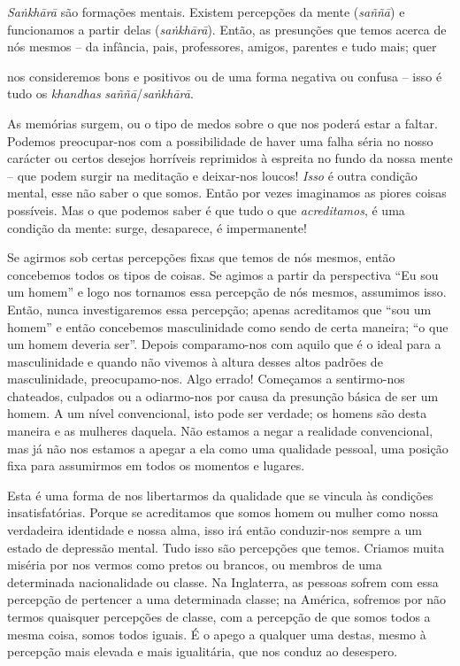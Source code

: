 \emph{Saṅkhārā} são formações mentais. Existem percepções da mente
(\emph{saññā}) e funcionamos a partir delas (\emph{saṅkhārā}). Então, as
presunções que temos acerca de nós mesmos -- da infância, pais, professores,
amigos, parentes e tudo mais; quer

nos consideremos bons e positivos ou de uma forma negativa ou confusa -- isso é
tudo os \emph{khandhas} \emph{saññā}/\emph{saṅkhārā}.

As memórias surgem, ou o tipo de medos sobre o que nos poderá estar a faltar.
Podemos preocupar-nos com a possibilidade de haver uma falha séria no nosso
carácter ou certos desejos horríveis reprimidos à espreita no fundo da nossa
mente -- que podem surgir na meditação e deixar-nos loucos! \emph{Isso} é outra
condição mental, esse não saber o que somos. Então por vezes imaginamos as
piores coisas possíveis. Mas o que podemos saber é que tudo o que
\emph{acreditamos}, é uma condição da mente: surge, desaparece, é impermanente!

Se agirmos sob certas percepções fixas que temos de nós mesmos, então concebemos
todos os tipos de coisas. Se agimos a partir da perspectiva ``Eu sou um homem''
e logo nos tornamos essa percepção de nós mesmos, assumimos isso. Então, nunca
investigaremos essa percepção; apenas acreditamos que ``sou um homem'' e então
concebemos masculinidade como sendo de certa maneira; ``o que um homem deveria
ser''. Depois comparamo-nos com aquilo que é o ideal para a masculinidade e
quando não vivemos à altura desses altos padrões de masculinidade,
preocupamo-nos. Algo errado! Começamos a sentirmo-nos chateados, culpados ou a
odiarmo-nos por causa da presunção básica de ser um homem. A um nível
convencional, isto pode ser verdade; os homens são desta maneira e as mulheres
daquela. Não estamos a negar a realidade convencional, mas já não nos estamos a
apegar a ela como uma qualidade pessoal, uma posição fixa para assumirmos em
todos os momentos e lugares.

Esta é uma forma de nos libertarmos da qualidade que se vincula às condições
insatisfatórias. Porque se acreditamos que somos homem ou mulher como nossa
verdadeira identidade e nossa alma, isso irá então conduzir-nos sempre a um
estado de depressão mental. Tudo isso são percepções que temos. Criamos muita
miséria por nos vermos como pretos ou brancos, ou membros de uma determinada
nacionalidade ou classe. Na Inglaterra, as pessoas sofrem com essa percepção de
pertencer a uma determinada classe; na América, sofremos por não termos
quaisquer percepções de classe, com a percepção de que somos todos a mesma
coisa, somos todos iguais. É o apego a qualquer uma destas, mesmo à percepção
mais elevada e mais igualitária, que nos conduz ao desespero.

